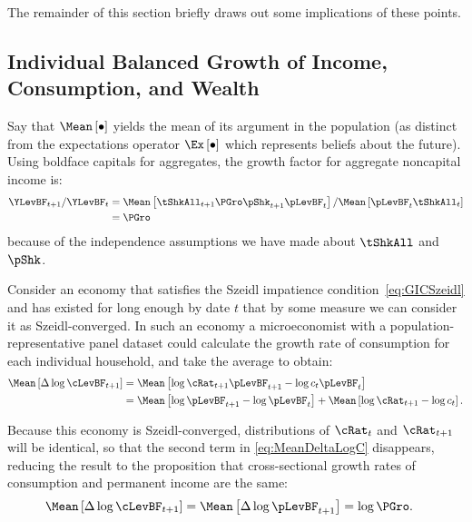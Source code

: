 \documentclass[BufferStockTheory]{subfiles}
\begin{document}
The remainder of this section briefly draws out some implications of these points.

\hypertarget{Growth-Rates-of-Individual-Income-and-Consumption}{}
\subsection{Individual Balanced Growth of  Income, Consumption, and Wealth}\label{subsec:cGroEqPGroQ}

Say that $\Mean\left[\bullet\right]$ yields the mean of its argument in the population (as distinct from the expectations operator $\Ex\left[\bullet\right]$ which represents beliefs about the future).  Using boldface capitals for aggregates, the growth factor for aggregate noncapital income is:
\begin{align*}
    \YLevBF_{t+1}/\YLevBF_{t}  & = \Mean\left[\tShkAll_{t+1}\PGro \pShk_{t+1}\pLevBF_{t}\right]/\Mean\left[\pLevBF_{t}\tShkAll_{t}\right]  \\
    & = \PGro
\end{align*}
because of the independence assumptions we have made about $\tShkAll$ and $\pShk$.

Consider an economy that satisfies the Szeidl impatience condition~\eqref{eq:GICSzeidl} and has existed for long enough by date $t$ that by some measure we can consider it as Szeidl-converged.  In such an economy a microeconomist with a population-representative panel dataset could calculate the growth rate of consumption for each individual household, and take the average to obtain:
\begin{align}
    \Mean\left[\Delta \log \cLevBF_{t+1}\right]  & = \Mean\left[ \log {\cRat}_{t+1}\pLevBF_{t+1} - \log c_{t}\pLevBF_{t}\right]  \notag \\
    & = \Mean\left[ \log \pLevBF_{t+1}- \log \pLevBF_{t}\right] + \Mean\left[ \log {\cRat}_{t+1} - \log c_{t}\right] \label{eq:MeanDeltaLogC}.
\end{align}

Because this economy is Szeidl-converged, distributions of $\cRat_{t}$ and $\cRat_{t+1}$ will be identical, so that the second term in  \eqref{eq:MeanDeltaLogC} disappears, reducing the result to the proposition that cross-sectional growth rates of consumption and permanent income are the same:
\begin{align}
    \Mean\left[\Delta \log \cLevBF_{t+1}\right]  & = \Mean\left[ \Delta \log \pLevBF_{t+1}\right] = \log \PGro \label{eq:MeanDeltaLogCeqMeanDeltaLogP}.
\end{align}
\end{document}
